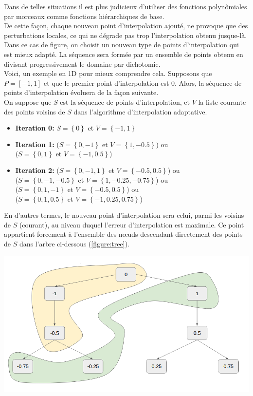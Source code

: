 \hspace{0.5cm}Dans de telles situations il est plus judicieux d'utiliser des fonctions polynômiales par morceaux comme fonctions hiérarchiques de base.\\
De cette façon, chaque nouveau point d'interpolation ajouté, ne provoque que des perturbations locales, ce qui ne dégrade pas trop l'interpolation obtenu jusque-là.\\
Dans ce cas de figure, on choisit un nouveau type de points d'interpolation qui est mieux adapté. La séquence sera formée par un ensemble de points obtenu en divisant progressivement le domaine par dichotomie.\\
Voici, un exemple en 1D pour mieux comprendre cela. Supposons que $P = \left [ -1, 1 \right ]$ et que le premier point d'interpolation est $0$. Alors, la séquence de points d'interpolation évoluera de la façon suivante.\\
On suppose que $S$ est la séquence de points d'interpolation, et $V$ la liste courante des points voisins de $S$ dans l'algorithme d'interpolation adaptative.
\begin{itemize}
\item \textbf{Iteration 0:} $S = \left \{ 0 \right \}$ et $V = \left \{ -1,1 \right \}$
\item \textbf{Iteration 1:} ($S = \left \{ 0, -1 \right \}$ et $V = \left \{ 1, -0.5 \right \}$) ou \\
($S = \left \{ 0, 1 \right \}$ et $V = \left \{ -1, 0.5 \right \}$)
\item \textbf{Iteration 2:} ($S = \left \{ 0, -1, 1\right \}$ et $V = \left \{ -0.5, 0.5 \right \}$) ou \\
($S = \left \{ 0, -1, -0.5 \right \}$ et $V = \left \{ 1, -0.25, -0.75\right \}$) ou \\
($S = \left \{ 0, 1, -1 \right \}$ et $V = \left \{ -0.5, 0.5\right \}$) ou \\
($S = \left \{ 0, 1, 0.5 \right \}$ et $V = \left \{ -1, 0.25, 0.75\right \}$)
\end{itemize}
En d'autres termes, le nouveau point d'interpolation sera celui, parmi les voisins de $S$ (courant), au niveau duquel l'erreur d'interpolation est maximale.
Ce point appartient forcement à l'ensemble des nœuds descendant directement des points de $S$ dans l'arbre ci-dessous (\ref{figure:tree}).
\begin{center}
\includegraphics[height= 6 cm,width = 9 cm]{images/tree.png}
\label{figure:tree}
\end{center}
